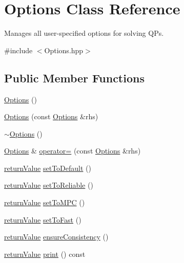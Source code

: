 \hypertarget{class_options}{}\section{Options Class Reference}
\label{class_options}


Manages all user-\/specified options for solving Q\+Ps.  




{\ttfamily \#include $<$Options.\+hpp$>$}

\subsection*{Public Member Functions}
\begin{DoxyCompactItemize}
\item 
\hyperlink{class_options_aeaece707f540fe3efef777a934e3d273}{Options} ()
\item 
\hyperlink{class_options_ad9215a27608868991e0cd3e9081cb3b4}{Options} (const \hyperlink{class_options}{Options} \&rhs)
\item 
\hyperlink{class_options_a86ddb85b183f8b58af5481f30a42fa92}{$\sim$\+Options} ()
\item 
\hyperlink{class_options}{Options} \& \hyperlink{class_options_a58a8fea98a7e4c83e6692084e4227fa8}{operator=} (const \hyperlink{class_options}{Options} \&rhs)
\item 
\hyperlink{_message_handling_8hpp_a81d556f613bfbabd0b1f9488c0fa865e}{return\+Value} \hyperlink{class_options_abea747512c08e02ef1148efec0fcddca}{set\+To\+Default} ()
\item 
\hyperlink{_message_handling_8hpp_a81d556f613bfbabd0b1f9488c0fa865e}{return\+Value} \hyperlink{class_options_a9febf0968f9e848e701b996b6694db73}{set\+To\+Reliable} ()
\item 
\hyperlink{_message_handling_8hpp_a81d556f613bfbabd0b1f9488c0fa865e}{return\+Value} \hyperlink{class_options_a3127057d81b63c2206a3a59adca44b9b}{set\+To\+M\+PC} ()
\item 
\hyperlink{_message_handling_8hpp_a81d556f613bfbabd0b1f9488c0fa865e}{return\+Value} \hyperlink{class_options_a78bc5793ae28467496254f6b59f503c0}{set\+To\+Fast} ()
\item 
\hyperlink{_message_handling_8hpp_a81d556f613bfbabd0b1f9488c0fa865e}{return\+Value} \hyperlink{class_options_af10ef0a01e3be1db805a3fa4aea094db}{ensure\+Consistency} ()
\item 
\hyperlink{_message_handling_8hpp_a81d556f613bfbabd0b1f9488c0fa865e}{return\+Value} \hyperlink{class_options_afc24e794f0871176e811de2671259374}{print} () const
\end{DoxyCompactItemize}
